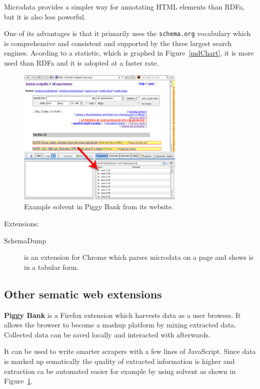 \documentclass[12pt]{article}
\newcommand{\co}[1]{\texttt{#1}}
\begin{document}
Microdata provides a simpler way for annotating HTML elements than RDFa, but it
is also less powerful.

One of its advantages is that it primarily uses the \co{schema.org} vocabulary
which is comprehensive and consistent and supported by the three largest search
engines. Acording to a statistic\cite{mdStat}, which is graphed in
Figure~\ref{mdChart}, it is more used than RDFa and it is adopted at a faster
rate.

\begin{figure}[t!]
    \centering
    \includegraphics[width=8cm]{piggy}
    \caption{Example solvent in Piggy Bank from its website.}
    \label{pbSolvent}
\end{figure}

Extensions:

\begin{description}
    \item[SchemaDump] is an extension for Chrome which parses microdata on a
    page and shows is in a tabular form\cite{schemaDump}.
\end{description}

\subsection{Other sematic web extensions}

\textbf{Piggy Bank} is a Firefox extension which harvests data as a user
browses. It allows the browser to become a mashup platform by mixing extracted
data. Collected data can be saved locally and interacted with
afterwards.\cite{piggyBank}

It can be used to write smarter scrapers with a few lines of JavaScript. Since
data is marked up sematically the quality of extracted information is higher and
extraction ca be automated easier for example by using solvent as shown in
Figure~\ref{pbSolvent}.
\end{document}
